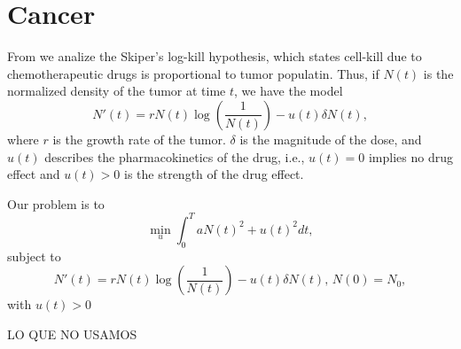 \section{Cancer} \label{Chap2-Sect3}
    From {\cite{PanettaFister}} we analize the Skiper's log-kill hypothesis, which
    states cell-kill due to chemotherapeutic drugs is
    proportional to tumor populatin. Thus, if $N(t)$ is the normalized density
    of the tumor at time $t$, we have the model
    \begin{equation*}
        N'(t) = r N(t) \log{(\dfrac{1}{N(t)})} - u(t)\delta N(t),
    \end{equation*}
    where $r$ is the growth rate of the tumor. $\delta$ is the magnitude of the dose,
    and $u(t)$ describes the pharmacokinetics of the drug, i.e., $u(t) = 0$ implies
    no drug effect and $u(t) > 0 $ is the strength of the drug effect.


    
    Our problem is to 
    \begin{equation*}
        \min_{u} \int_{0}^{T} a N(t)^{2} + u(t)^{2} dt,
    \end{equation*}
    subject to
    \begin{equation*}
        N'(t) = r N(t) \log{(\dfrac{1}{N(t)})} - u(t)\delta N(t), \, N(0) = N_0,
    \end{equation*}
    with $u(t) > 0$
        
    
\newpage

LO QUE NO USAMOS



